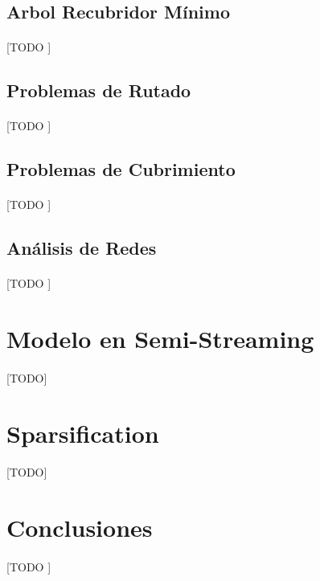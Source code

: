 \documentclass{subfiles}
\begin{document}
      \subsection{Arbol Recubridor Mínimo}
      \label{sec:minimum_spanning_tree}

        \paragraph{}
        [TODO ]

      \subsection{Problemas de Rutado}
      \label{sec:network_routing}

        \paragraph{}
        [TODO ]

      \subsection{Problemas de Cubrimiento}
      \label{sec:network_covering}

        \paragraph{}
        [TODO ]

      \subsection{Análisis de Redes}
      \label{sec:network_analysis}

        \paragraph{}
        [TODO ]

    \section{Modelo en Semi-Streaming}
    \label{sec:semi_streaming_model}

      \paragraph{}
      [TODO]

    \section{Sparsification}
    \label{sec:graph_sparsification}

      \paragraph{}
      [TODO]


    \section{Conclusiones}
    \label{sec:graphs_conclusions}

      \paragraph{}
      [TODO ]
\end{document}
